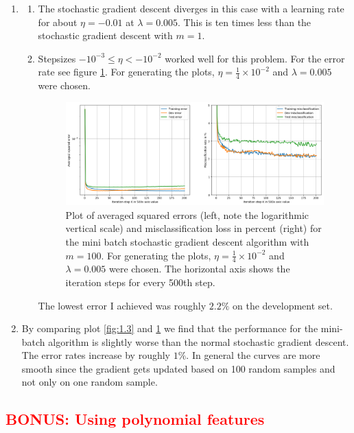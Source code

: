\documentclass[12pt]{article}
\begin{document}
\begin{enumerate}
	\item 
	\begin{enumerate}[label=(\alph*)]
		\item The stochastic gradient descent diverges in this case with a learning rate for about $\eta=-0.01$ at $\lambda=0.005$. This is ten times less than the stochastic gradient descent with $m=1$.
		\item Stepsizes $ -10^{-3} \leq \eta < -10^{-2} $ worked well for this problem. For the error rate see figure \ref{fig:1.4}. For generating the plots, $\eta = \frac{1}{4}\times 10^{-2}$ and $\lambda=0.005$ were chosen.
		\begin{figure}[h!]
			\centering
			\includegraphics[width=0.85\linewidth]{./Problem_1/Problem_1.4.png}
			\caption{Plot of averaged squared errors (left, note the logarithmic vertical scale) and misclassification loss in percent (right) for the mini batch stochastic gradient descent algorithm with $m=100$. For generating the plots, $\eta = \frac{1}{4}\times 10^{-2}$ and $\lambda=0.005$ were chosen. The horizontal axis shows the iteration steps for every 500th step.}
			\label{fig:1.4}
		\end{figure}
		The lowest error I achieved was roughly $2.2\%$ on the development set.
	\end{enumerate}
	\item 
	By comparing plot \ref{fig:1.3} and \ref{fig:1.4} we find that the performance for the mini-batch algorithm is slightly worse than the normal stochastic gradient descent. The error rates increase by roughly $1\%$. In general the curves are more smooth since the gradient gets updated based on 100 random samples and not only on one random sample.
\end{enumerate}



\subsection{\textcolor{red}{BONUS: Using polynomial features}}
\end{document}
